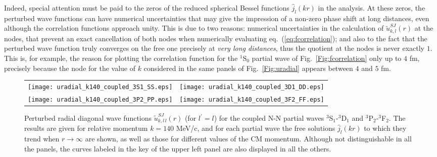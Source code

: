 \documentclass[aps,twocolumn,showpacs,preprintnumbers,amsmath,amssymb,nofootinbib,superscriptaddress,showkeys,noeprint]{revtex4-1}
\begin{document}
Indeed, special attention must be paid to the zeros of the reduced
spherical Bessel functions $\hat{j}_l(kr)$ in the analysis. At these
zeros, the perturbed wave functions can have numerical uncertainties
that may give the impression of a non-zero phase shift at long
distances, even although the correlation functions approach unity.
This is due to two reasons: numerical uncertainties in the calculation
of $\widetilde{u}^{SJ}_{k,l}(r)$ at the nodes, that prevent an exact
cancellation of both nodes when numerically evaluating
eq.~(\ref{eq:fcorrelation}); and also to the fact that the perturbed
wave function truly converges on the free one precisely at \emph{very
long distances}, thus the quotient at the nodes is never exactly
$1$. This is, for example, the reason for plotting the correlation
function for the ${}^{1}$S$_0$ partial wave of
Fig.~\ref{Fig:fcorrelation} only up to $4$ fm, precisely because the
node for the value of $k$ considered in the same panels of
Fig.~\ref{Fig:uradial} appears between $4$ and $5$ fm.

\begin{figure*}[!ht]
\begin{tabular}{cc}
\texttt{[image: uradial\_k140\_coupled\_3S1\_SS.eps]}&
\texttt{[image: uradial\_k140\_coupled\_3D1\_DD.eps]}\\
\texttt{[image: uradial\_k140\_coupled\_3P2\_PP.eps]}&
\texttt{[image: uradial\_k140\_coupled\_3F2\_FF.eps]}\\
\end{tabular}
\caption{Perturbed radial diagonal wave functions
  $\widetilde{u}^{SJ}_{k,l\,l}(r)$ (for $l^\prime=l$) for the coupled
  N-N partial waves ${}^{3}$S$_1$-${}^{3}$D$_1$ and
  ${}^{3}$P$_2$-${}^{3}$F$_2$. The results are given for relative
  momentum $k=140$ MeV/c, and for each partial wave the free solutions
  $\hat{j}_l(kr)$ to which they trend when $r\rightarrow\infty$ are
  shown, as well as those for different values of the CM
  momentum. Although not distinguishable in all the panels, the curves
  labeled in the key of the upper left panel are also displayed in
  all the others. }
\label{Fig:uradial_coupled}
\end{figure*}
\end{document}
